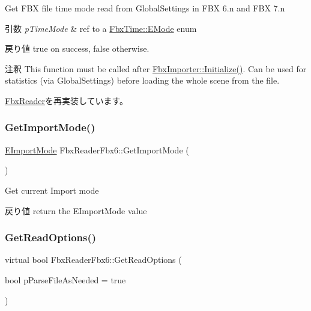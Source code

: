 Get F\+BX file time mode read from Global\+Settings in F\+BX 6.\+n and F\+BX 7.\+n 
\begin{DoxyParams}{引数}
{\em p\+Time\+Mode} & ref to a \hyperlink{class_fbx_time_acc529b00a0e8d4c3da3702449ca93031}{Fbx\+Time\+::\+E\+Mode} enum \\
\hline
\end{DoxyParams}
\begin{DoxyReturn}{戻り値}
{\ttfamily true} on success, {\ttfamily false} otherwise. 
\end{DoxyReturn}
\begin{DoxyRemark}{注釈}
This function must be called after \hyperlink{class_fbx_importer_a70528a9ca1ff737bda9696a2073acd13}{Fbx\+Importer\+::\+Initialize()}. Can be used for statistics (via Global\+Settings) before loading the whole scene from the file. 
\end{DoxyRemark}


\hyperlink{class_fbx_reader_a3b218671126e70a29f644407a7f307e9}{Fbx\+Reader}を再実装しています。

\mbox{\label{class_fbx_reader_fbx6_aeafb8a0b4017c0d20630bc06ed4c08c4}} 
\subsubsection{\texorpdfstring{Get\+Import\+Mode()}{GetImportMode()}}
{\footnotesize\ttfamily \hyperlink{class_fbx_reader_fbx6_ac6bc45d165880315e2657abf7ca16495}{E\+Import\+Mode} Fbx\+Reader\+Fbx6\+::\+Get\+Import\+Mode (\begin{DoxyParamCaption}{ }\end{DoxyParamCaption})}

Get current Import mode \begin{DoxyReturn}{戻り値}
return the E\+Import\+Mode value 
\end{DoxyReturn}
\mbox{\label{class_fbx_reader_fbx6_afe24d36b1c38806c9ace6a6d1a782b88}} 
\subsubsection{\texorpdfstring{Get\+Read\+Options()}{GetReadOptions()}\hspace{0.1cm}{\footnotesize\ttfamily [1/2]}}
{\footnotesize\ttfamily virtual bool Fbx\+Reader\+Fbx6\+::\+Get\+Read\+Options (\begin{DoxyParamCaption}\item[{bool}]{p\+Parse\+File\+As\+Needed = {\ttfamily true} }\end{DoxyParamCaption})\hspace{0.3cm}{\ttfamily [virtual]}}

